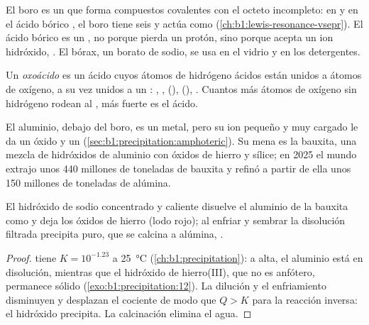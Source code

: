 El boro es un  que forma compuestos covalentes con el octeto
incompleto: en  y en el ácido bórico , el boro tiene
seis  y actúa como 
(\cref{ch:b1:lewis-resonance-vsepr}). El ácido bórico es un ,
no porque pierda un protón, sino porque acepta un ion hidróxido,
. El bórax, un borato de sodio, se
usa en el vidrio y en los detergentes.

\begin{definition}[Oxoácido]\label{def:b1:p-block-13-15:oxoacid}
Un \emph{oxoácido} es un ácido cuyos átomos de
hidrógeno ácidos están unidos a átomos de oxígeno, a su vez unidos a un
:
, ,  (), 
(), . Cuantos más átomos de oxígeno sin hidrógeno
rodean al , más fuerte es el ácido.
\end{definition}

El aluminio, debajo del boro, es un metal, pero su ion pequeño y muy
cargado le da un óxido y un 
(\cref{sec:b1:precipitation:amphoteric}). Su mena es la bauxita, una
mezcla de hidróxidos de aluminio con óxidos de hierro y sílice; en 2025
el mundo extrajo unos 440 millones de toneladas de bauxita y refinó a
partir de ella unos 150 millones de toneladas de alúmina.

\begin{proposition}\label{prop:b1:p-block-13-15:bayer}
El hidróxido de sodio concentrado y caliente disuelve el aluminio de la
bauxita como  y deja los óxidos de hierro (lodo rojo); al
enfriar y sembrar la disolución filtrada precipita  puro, que
se calcina a alúmina,
.
\end{proposition}

\begin{proof}
 tiene $K = 10^{-1.23}$ a
\qty{25}{\celsius} (\cref{ch:b1:precipitation}): a \ce{[OH-]} alta, el
aluminio está en disolución, mientras que el hidróxido de hierro(III), que
no es anfótero, permanece sólido (\cref{exo:b1:precipitation:12}). La
dilución y el enfriamiento disminuyen \ce{[OH-]} y desplazan el cociente
de modo que $Q > K$ para la reacción inversa: el hidróxido precipita. La
calcinación elimina el agua.
\end{proof}

